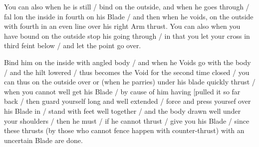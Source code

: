 \newpage


\newpage



You can also when he is still / bind on the outside, and when he goes
through / fal lon the inside in fourth on his Blade / and then when he
voids, on the outside with fourth in an even line over his right Arm
thrust. You can also when you have bound on the outside stop his going
through / in that you let your cross in third feint below / and
let the point go over.


Bind him on the inside with angled body / and when he Voids go with
the body / and the hilt lowered / thus becomes the Void for the second
time closed / you can thus on the outside over or (when he parries)
under his blade quickly thrust / when you cannot well get his Blade /
by cause of him having [pulled it so far back / then guard yourself
long and well extended / force and press yoursef over his Blade in /
stand with feet well together / and the body drawn well under your
shoulders / then he must / if he cannot
thrust / give you his Blade / since these thrusts (by those who cannot
fence happen with counter-thrust) with an uncertain
Blade are done.

